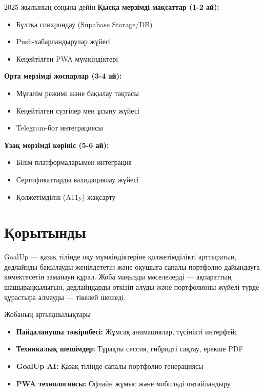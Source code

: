 \documentclass[12pt,a4paper]{article}
\begin{document}
\begin{infobox}{2025 жылының соңына дейін}
\textbf{Қысқа мерзімді мақсаттар (1-2 ай):}
\begin{itemize}
    \item Бұлтқа синхрондау (Supabase Storage/DB)
    \item Push-хабарландырулар жүйесі
    \item Кеңейтілген PWA мүмкіндіктері
\end{itemize}

\textbf{Орта мерзімді жоспарлар (3-4 ай):}
\begin{itemize}
    \item Мұғалім режимі және бақылау тақтасы
    \item Кеңейтілген сүзгілер мен ұсыну жүйесі
    \item Telegram-бот интеграциясы
\end{itemize}

\textbf{Ұзақ мерзімді көрініс (5-6 ай):}
\begin{itemize}
    \item Білім платформаларымен интеграция
    \item Сертификаттарды валидациялау жүйесі
    \item Қолжетімділік (A11y) жақсарту
\end{itemize}
\end{infobox}

\section{Қорытынды}

GoalUp — қазақ тілінде оқу мүмкіндіктеріне қолжетімділікті арттыратын, дедлайнды бақылауды жеңілдететін және оқушыға сапалы портфолио дайындауға көмектесетін заманауи құрал. Жоба маңызды мәселелерді — ақпараттың шашыраңқылығын, дедлайндарды өткізіп алуды және портфолионы жүйелі түрде құрастыра алмауды — тікелей шешеді.

\begin{featurebox}{Жобаның артықшылықтары}
\begin{itemize}
    \item \textbf{Пайдаланушы тәжірибесі:} Жұмсақ анимациялар, түсінікті интерфейс
    \item \textbf{Техникалық шешімдер:} Тұрақты сессия, гибридті сақтау, ерекше PDF
    \item \textbf{GoalUp AI:} Қазақ тілінде сапалы портфолио генерациясы
    \item \textbf{PWA технологиясы:} Офлайн жұмыс және мобильді оңтайландыру
\end{itemize}
\end{featurebox}
\end{document}
